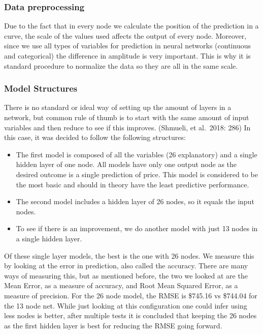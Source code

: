 \documentclass[
  paper=a4,
  ,captions=tableheading
]{scrartcl}
\begin{document}
\hypertarget{data-preprocessing}{%
\subsubsection{Data preprocessing}\label{data-preprocessing}}

Due to the fact that in every node we calculate the position of the
prediction in a curve, the scale of the values used affects the output
of every node. Moreover, since we use all types of variables for
prediction in neural networks (continuous and categorical) the
difference in amplitude is very important. This is why it is standard
procedure to normalize the data so they are all in the same scale.

\hypertarget{model-structures}{%
\subsubsection{Model Structures}\label{model-structures}}

There is no standard or ideal way of setting up the amount of layers in
a network, but common rule of thumb is to start with the same amount of
input variables and then reduce to see if this improves. (Shmueli, et
al.~2018: 286) In this case, it was decided to follow the following
structures:

\begin{itemize}
\item
  The first model is composed of all the variables (26 explanatory) and
  a single hidden layer of one node. All models have only one output
  node as the desired outcome is a single prediction of price. This
  model is considered to be the most basic and should in theory have the
  least predictive performance.
\item
  The second model includes a hidden layer of 26 nodes, so it equals the
  input nodes.
\item
  To see if there is an improvement, we do another model with just 13
  nodes in a single hidden layer.
\end{itemize}

Of these single layer models, the best is the one with 26 nodes. We
measure this by looking at the error in prediction, also called the
accuracy. There are many ways of measuring this, but as mentioned
before, the two we looked at are the Mean Error, as a measure of
accuracy, and Root Mean Squared Error, as a measure of precision. For
the 26 node model, the RMSE is \$745.16 vs \$744.04 for the 13 node net.
While just looking at this configuration one could infer using less
nodes is better, after multiple tests it is concluded that keeping the
26 nodes as the first hidden layer is best for reducing the RMSE going
forward.
\end{document}
